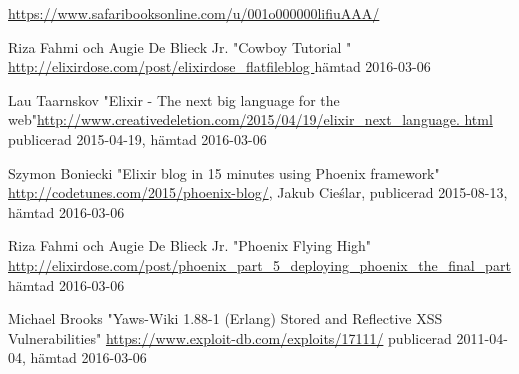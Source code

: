 \documentclass[12pt]{article}
\begin{document}
\begin{thebibliography}{99}
\url{https://www.safaribooksonline.com/u/001o000000lifiuAAA/}



Riza Fahmi och Augie De Blieck Jr.
 "Cowboy Tutorial " \url{http://elixirdose.com/post/elixirdose_flatfileblog }
hämtad 2016-03-06

 Lau Taarnskov "Elixir - The next big language for the web"\url{http://www.creativedeletion.com/2015/04/19/elixir_next_language.
html}
publicerad  2015-04-19,
hämtad 2016-03-06



 Szymon Boniecki "Elixir blog in 15 minutes using Phoenix framework" \url{http://codetunes.com/2015/phoenix-blog/}, Jakub Cieślar, publicerad 2015-08-13,
hämtad 2016-03-06

Riza Fahmi och Augie De Blieck Jr.
  "Phoenix Flying High" \url{http://elixirdose.com/post/phoenix_part_5_deploying_phoenix_the_final_part} 
hämtad 2016-03-06






 Michael Brooks "Yaws-Wiki 1.88-1 (Erlang) Stored and Reflective XSS Vulnerabilities"  \url{https://www.exploit-db.com/exploits/17111/}
publicerad 2011-04-04,
hämtad 2016-03-06



\end{thebibliography}
\end{document}
